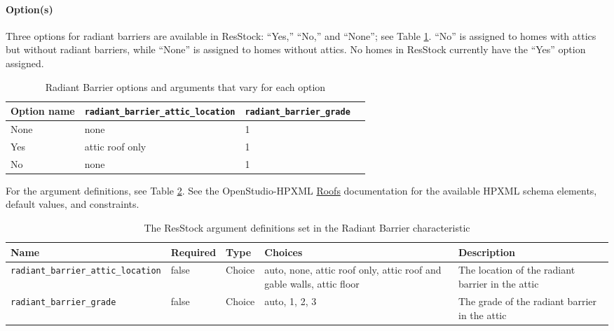 \paragraph{Option(s)}
Three options for radiant barriers are available in ResStock: ``Yes,'' ``No,'' and ``None''; see Table \ref{table:hc_opt_rad_bar}. ``No'' is assigned to homes with attics but without radiant barriers, while ``None'' is assigned to homes without attics. No homes in ResStock currently have the ``Yes'' option assigned.

\begin{longtable}[]{|p{2.5cm}|p{2.5cm}|p{3cm}|p{3cm}|} \caption{Radiant Barrier options and arguments that vary for each option} \label{table:hc_opt_rad_bar} \\  

\toprule\noalign{}
Option name &
\texttt{radiant\_barrier\_attic\_location} &
\texttt{radiant\_barrier\_grade} \\
\midrule\noalign{}
\endhead
\bottomrule\noalign{}
\endlastfoot
None & none & 1 \\
Yes & attic roof only & 1 \\
No & none & 1 \\
\end{longtable}

For the argument definitions, see Table \ref{table:hc_arg_def_rad_bar}. See the OpenStudio-HPXML \href{https://openstudio-hpxml.readthedocs.io/en/v1.8.1/workflow_inputs.html#hpxml-roofs}{Roofs} documentation for the available HPXML schema elements, default values, and constraints.

\begin{longtable}[]{|p{3.5cm}|p{1.5cm}|p{1.1cm}|p{3.3cm}|p{4.3cm}|} \caption{The ResStock argument definitions set in the Radiant Barrier characteristic} \label{table:hc_arg_def_rad_bar} \\

\toprule\noalign{}
Name & Required &  Type & Choices & Description \\
\midrule\noalign{}
\endhead
\bottomrule\noalign{}
\endlastfoot
\texttt{radiant\_barrier\_attic\_location} & false & Choice & auto,
none, attic roof only, attic roof and gable walls, attic floor & The
location of the radiant barrier in the attic \\
\hline
\texttt{radiant\_barrier\_grade} & false &  Choice & auto, 1, 2, 3 &
The grade of the radiant barrier in the attic \\
\end{longtable}%

